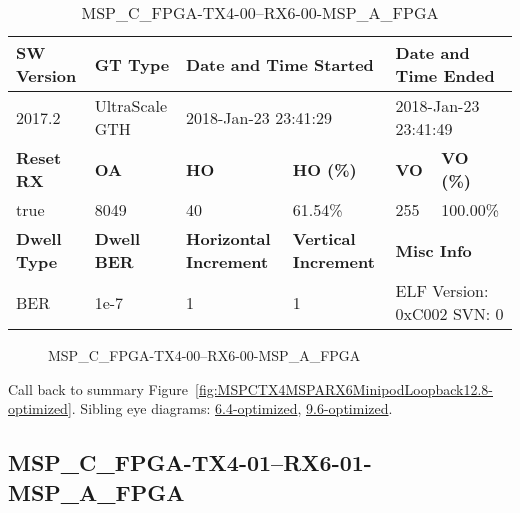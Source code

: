 \begin{table}[h]
\centering
\caption{MSP\_C\_FPGA-TX4-00--RX6-00-MSP\_A\_FPGA}
\label{tab:MSPCFPGATX400RX600MSPAFPGA12.8-optimized}
\begin{tabular}{@{}|l|l|l|l|l|l|@{}}
\toprule
\textbf{SW Version}                & \textbf{GT Type}   & \multicolumn{2}{l|}{\textbf{Date and Time Started}}            & \multicolumn{2}{l|}{\textbf{Date and Time Ended}}        \\ \midrule
2017.2                       & UltraScale GTH          & \multicolumn{2}{l|}{2018-Jan-23 23:41:29}                   & \multicolumn{2}{l|}{2018-Jan-23 23:41:49}               \\ \midrule
\textbf{Reset RX}                  & \textbf{OA} & \textbf{HO}   & \textbf{HO (\%)} & \textbf{VO} & \textbf{VO (\%)} \\ \midrule
true & 8049        & 40          & 61.54\%        & 255        & 100.00\%       \\ \midrule
\textbf{Dwell Type}                & \textbf{Dwell BER} & \textbf{Horizontal Increment} & \textbf{Vertical Increment}    & \multicolumn{2}{l|}{\textbf{Misc Info}}                  \\ \midrule
BER                            & 1e-7        & 1        & 1           & \multicolumn{2}{l|}{ELF Version: 0xC002 SVN: 0}                         \\ \bottomrule
\end{tabular}
\end{table}

\begin{figure}[h]
\caption{MSP\_C\_FPGA-TX4-00--RX6-00-MSP\_A\_FPGA} \label{fig:MSPCFPGATX400RX600MSPAFPGA12.8-optimized}
\end{figure}

Call back to summary Figure~\ref{fig:MSPCTX4MSPARX6MinipodLoopback12.8-optimized}.
Sibling eye diagrams: \hyperref[sec:MSPCFPGATX400RX600MSPAFPGA6.4-optimized]{6.4-optimized}, \hyperref[sec:MSPCFPGATX400RX600MSPAFPGA9.6-optimized]{9.6-optimized}.

\clearpage
\newpage


\subsection{MSP\_C\_FPGA-TX4-01--RX6-01-MSP\_A\_FPGA}\label{sec:MSPCFPGATX401RX601MSPAFPGA12.8-optimized}

